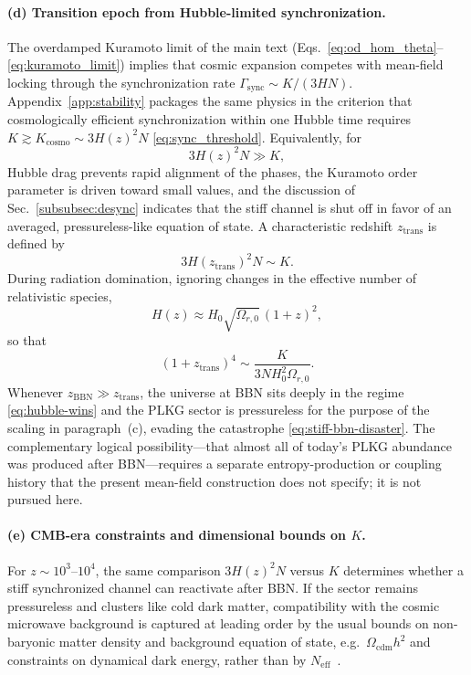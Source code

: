 \paragraph{(d) Transition epoch from Hubble-limited synchronization.}
The overdamped Kuramoto limit of the main text (Eqs.~\eqref{eq:od_hom_theta}--\eqref{eq:kuramoto_limit}) implies that cosmic expansion competes with mean-field locking through the synchronization rate $\Gamma_{\mathrm{sync}}\sim K/(3HN)$.
Appendix~\ref{app:stability} packages the same physics in the criterion that cosmologically efficient synchronization within one Hubble time requires $K\gtrsim K_{\mathrm{cosmo}}\sim 3H(z)^2N$ \eqref{eq:sync_threshold}.
Equivalently, for
\begin{equation}
3H(z)^2N \gg K,
\label{eq:hubble-wins}
\end{equation}
Hubble drag prevents rapid alignment of the phases, the Kuramoto order parameter is driven toward small values, and the discussion of Sec.~\ref{subsubsec:desync} indicates that the stiff channel is shut off in favor of an averaged, pressureless-like equation of state.
A characteristic redshift $z_{\mathrm{trans}}$ is defined by
\begin{equation}
3H(z_{\mathrm{trans}})^2N \sim K.
\label{eq:ztrans-def}
\end{equation}
During radiation domination, ignoring changes in the effective number of relativistic species,
\begin{equation}
H(z)\approx H_0\sqrt{\Omega_{r,0}}\,(1+z)^2,
\label{eq:H-rad-approx}
\end{equation}
so that
\begin{equation}
(1+z_{\mathrm{trans}})^4\sim\frac{K}{3N H_0^2\Omega_{r,0}}.
\label{eq:ztrans-scaling}
\end{equation}
Whenever $z_{\mathrm{BBN}}\gg z_{\mathrm{trans}}$, the universe at BBN sits deeply in the regime \eqref{eq:hubble-wins} and the PLKG sector is pressureless for the purpose of the scaling in paragraph~(c), evading the catastrophe \eqref{eq:stiff-bbn-disaster}.
The complementary logical possibility---that almost all of today's PLKG abundance was produced after BBN---requires a separate entropy-production or coupling history that the present mean-field construction does not specify; it is not pursued here.

\paragraph{(e) CMB-era constraints and dimensional bounds on $K$.}
For $z\sim 10^{3}$--$10^{4}$, the same comparison $3H(z)^2N$ versus $K$ determines whether a stiff synchronized channel can reactivate after BBN.
If the sector remains pressureless and clusters like cold dark matter, compatibility with the cosmic microwave background is captured at leading order by the usual bounds on non-baryonic matter density and background equation of state, e.g.\ $\Omega_{\mathrm{cdm}}h^2$ and constraints on dynamical dark energy, rather than by $N_{\mathrm{eff}}$~\cite{Planck2018}.

